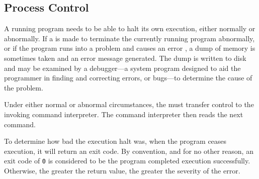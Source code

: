 \subsection{Process Control}\label{subsec:Process_Control}
A running program needs to be able to halt its own execution, either normally or abnormally.
If a  is made to terminate the currently running program abnormally, or if the program runs into a problem and causes an error , a dump of memory is sometimes taken and an error message generated.
The dump is written to disk and may be examined by a debugger—a system program designed to aid the programmer in finding and correcting errors, or bugs—to determine the cause of the problem.

Under either normal or abnormal circumstances, the  must transfer control to the invoking command interpreter.
The command interpreter then reads the next command.

To determine how bad the execution halt was, when the program ceases execution, it will return an exit code.
By convention, and for no other reason, an exit code of \texttt{0} is considered to be the program completed execution successfully.
Otherwise, the greater the return value, the greater the severity of the error.

